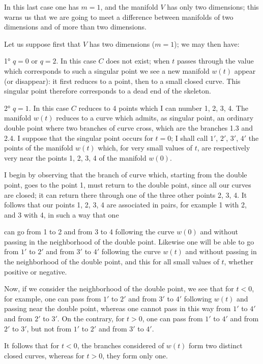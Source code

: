 \documentclass{article}
\begin{document}
In this last case one has $m = 1$, and the manifold $V$ has only two dimensions; this warns us that we are going to meet a difference between manifolds of two dimensions and of more than two dimensions.

Let us suppose first that $V$ has two dimensions ($m = 1$); we may then have:

1° $q = 0$ or $q = 2$. In this case $C$ does not exist; when $t$ passes through the value which corresponds to such a singular point we see a new manifold $w(t)$ appear (or disappear): it first reduces to a point, then to a small closed curve. This singular point therefore corresponds to a dead end of the skeleton.

2° $q = 1$. In this case $C$ reduces to 4 points which I can number 1, 2, 3, 4. The manifold $w(t)$ reduces to a curve which admits, as singular point, an ordinary double point where two branches of curve cross, which are the branches 1.3 and 2.4. I suppose that the singular point occurs for $t = 0$; I shall call $1'$, $2'$, $3'$, $4'$ the points of the manifold $w(t)$ which, for very small values of $t$, are respectively very near the points 1, 2, 3, 4 of the manifold $w(0)$.

I begin by observing that the branch of curve which, starting from the double point, goes to the point 1, must return to the double point, since all our curves are closed; it can return there through one of the three other points 2, 3, 4. It follows that our points 1, 2, 3, 4 are associated in pairs, for example 1 with 2, and 3 with 4, in such a way that one

can go from 1 to 2 and from 3 to 4 following the curve $w(0)$ and without passing in the neighborhood of the double point. Likewise one will be able to go from $1'$ to $2'$ and from $3'$ to $4'$ following the curve $w(t)$ and without passing in the neighborhood of the double point, and this for all small values of $t$, whether positive or negative.

Now, if we consider the neighborhood of the double point, we see that for $t < 0$, for example, one can pass from $1'$ to $2'$ and from $3'$ to $4'$ following $w(t)$ and passing near the double point, whereas one cannot pass in this way from $1'$ to $4'$ and from $2'$ to $3'$. On the contrary, for $t > 0$, one can pass from $1'$ to $4'$ and from $2'$ to $3'$, but not from $1'$ to $2'$ and from $3'$ to $4'$.

It follows that for $t < 0$, the branches considered of $w(t)$ form two distinct closed curves, whereas for $t > 0$, they form only one.
\end{document}
